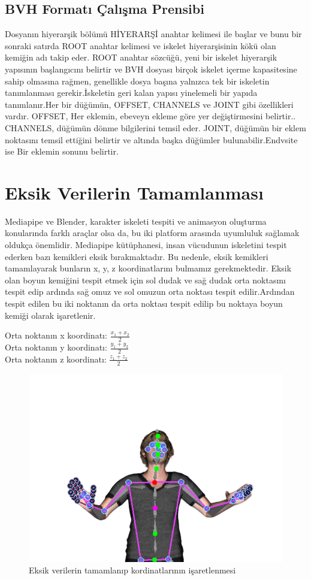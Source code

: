 \documentclass[12pt, a4paper]{article}
\begin{document}
\subsection{BVH Formatı Çalışma Prensibi}
Dosyanın hiyerarşik bölümü HİYERARŞİ anahtar kelimesi ile başlar ve bunu bir sonraki satırda ROOT
anahtar kelimesi ve iskelet hiyerarşisinin kökü olan kemiğin adı takip eder. ROOT anahtar sözcüğü, yeni
bir iskelet hiyerarşik yapısının başlangıcını belirtir ve BVH dosyası birçok iskelet içerme kapasitesine
sahip olmasına rağmen, genellikle dosya başına yalnızca tek bir iskeletin tanımlanması gerekir.İskeletin geri kalan yapısı yinelemeli bir yapıda tanımlanır.Her bir düğümün, OFFSET, CHANNELS ve JOINT gibi özellikleri vardır. OFFSET, Her eklemin, ebeveyn ekleme göre yer değiştirmesini belirtir.. CHANNELS, düğümün dönme bilgilerini temsil eder. JOINT, düğümün bir eklem noktasını temsil ettiğini belirtir ve altında başka düğümler bulunabilir.Endvsite ise Bir eklemin sonunu belirtir.\cite{article}


\section{Eksik Verilerin Tamamlanması}
Mediapipe ve Blender, karakter iskeleti tespiti ve animasyon oluşturma konularında farklı araçlar olsa da, bu iki platform arasında uyumluluk sağlamak oldukça önemlidir.
Mediapipe kütüphanesi, insan vücudunun iskeletini tespit ederken bazı kemikleri eksik bırakmaktadır.
Bu nedenle, eksik kemikleri tamamlayarak bunların x, y, z koordinatlarını bulmamız gerekmektedir.
Eksik olan boyun kemiğini tespit etmek için sol dudak ve sağ dudak orta noktasını tespit edip ardında sağ omuz ve sol omuzun orta noktası tespit edilir.Ardından tespit edilen bu iki noktanın da orta noktası tespit edilip bu noktaya boyun kemiği olarak işaretlenir.
\newline 

\begin{center}
	Orta noktanın x koordinatı: \( \frac{{x_1 + x_2}}{2} \) \\ 
	Orta noktanın y koordinatı: \( \frac{{y_1 + y_2}}{2} \) \\ 
	Orta noktanın z koordinatı: \( \frac{{z_1 + z_2}}{2} \)
\end{center}
\begin{figure}[h]
	\centering
	\includegraphics[width= 15 cm, height = 5 cm]{kemik-tamamlama.png}
	\caption{Eksik verilerin tamamlanıp kordinatlarının işaretlenmesi} 
\end{figure}
\end{document}
